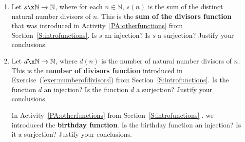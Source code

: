 \begin{enumerate}
%



\item Let $s\x\mathbb{N} \to \mathbb{N}$, where for each  $n \in \mathbb{N}$,  
$s( n )$ is the sum of the distinct natural number divisors of  $n$.  This is the \textbf{sum of the divisors function}
%
 that was introduced in \typeu Activity~\ref*{PA:otherfunctions} from Section~\ref{S:introfunctions}.  Is  $s$  an injection?  Is  $s$  a surjection?  Justify your conclusions.
\label{exer:sec63-sumdivisors}

\item Let  $d\x\mathbb{N} \to \mathbb{N}$,  where  $d( n )$ is the number of natural number divisors of  $n$.  This is the \textbf{number of divisors function}
%
 introduced in Exercise~(\ref{exer:numberofdivisors}) from Section~\ref{S:introfunctions}.  Is the function  $d$  an injection?  Is the function  $d$  a surjection?  Justify your conclusions.
\label{exer:sec63-numdivisors}

\xitem In \typeu Activity~\ref*{PA:otherfunctions} from Section~\ref{S:introfunctions} , we introduced the \textbf{birthday function}.
%
%
Is the birthday function an injection?  Is it a surjection?  Justify your conclusions. \label{exer:sec63-9}


\end{enumerate}
